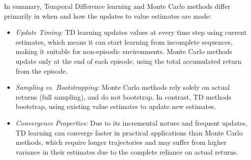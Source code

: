 In summary, Temporal Difference learning and Monte Carlo methods differ primarily in when and how the updates to value estimates are made:
\begin{itemize}
\item \emph{Update Timing:} TD learning updates values at every time step using current estimates, which means it can start learning from incomplete sequences, making it suitable for non-episodic environments. Monte Carlo methods update only at the end of each episode, using the total accumulated return from the episode.
\item \emph{Sampling vs. Bootstrapping:} Monte Carlo methods rely solely on actual returns (full sampling), and do not bootstrap. In contrast, TD methods bootstrap, using existing value estimates to update new estimates.
\item \emph{Convergence Properties:} Due to its incremental nature and frequent updates, TD learning can converge faster in practical applications than Monte Carlo methods, which require longer trajectories and may suffer from higher variance in their estimates due to the complete reliance on actual returns.
\end{itemize}

